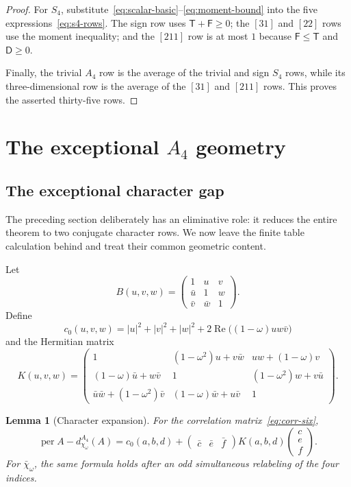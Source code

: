 \documentclass[11pt]{article}
\newtheorem{lemma}[theorem]{Lemma}
\theoremstyle{definition}
\newcommand{\per}{\operatorname{per}}
\newcommand{\Rea}{\operatorname{Re}}
\newcommand{\mat}[1]{\begin{pmatrix}#1\end{pmatrix}}
\begin{document}
\begin{proof}
For $S_4$, substitute~\eqref{eq:scalar-basic}--\eqref{eq:moment-bound} into
the five expressions~\eqref{eq:s4-rows}.  The sign row uses
$\mathsf T+\mathsf F\geq0$; the $[31]$ and $[22]$ rows use the moment
inequality; and the $[211]$ row is at most $1$ because
$\mathsf F\leq\mathsf T$ and $\mathsf D\geq0$.

Finally, the trivial $A_4$ row is the average of the trivial and sign $S_4$
rows, while its three-dimensional row is the average of the $[31]$ and
$[211]$ rows.  This proves the asserted thirty-five rows.
\end{proof}

\section{The exceptional \texorpdfstring{$A_4$}{A4} geometry}
\label{sec:a4-geometry}

\subsection{The exceptional character gap}

The preceding section deliberately has an eliminative role: it reduces the
entire theorem to two conjugate character rows.  We now leave the finite
table calculation behind and treat their common geometric content.

Let
\begin{equation}\label{eq:Buvw}
 B(u,v,w)=\mat{1&u&v\\\bar u&1&w\\\bar v&\bar w&1}.
\end{equation}
Define
\begin{equation}\label{eq:c0}
 c_0(u,v,w)=|u|^2+|v|^2+|w|^2
 +2\Rea\bigl((1-\omega)uw\bar v\bigr)
\end{equation}
and the Hermitian matrix
\begin{equation}\label{eq:K}
 K(u,v,w)=
 \mat{
 1&(1-\omega^2)u+v\bar w&uw+(1-\omega)v\\
 (1-\omega)\bar u+w\bar v&1&(1-\omega^2)w+v\bar u\\
 \bar u\bar w+(1-\omega^2)\bar v&(1-\omega)\bar w+u\bar v&1
 }.
\end{equation}

\begin{lemma}[Character expansion]\label{lem:a4-expansion}
For the correlation matrix~\eqref{eq:corr-six},
\begin{equation}\label{eq:a4-gap}
 \per A-d_{\chi_\omega}^{A_4}(A)
 =c_0(a,b,d)+\mat{\bar c&\bar e&\bar f}
 K(a,b,d)\mat{c\\e\\f}.
\end{equation}
For $\bar\chi_\omega$, the same formula holds after an odd simultaneous
relabeling of the four indices.
\end{lemma}
\end{document}
